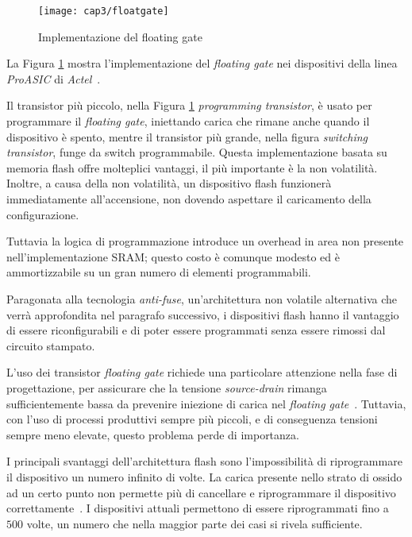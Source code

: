 \begin{figure}  
  \begin{center}
    \texttt{[image: cap3/floatgate]}
    \caption{Implementazione del floating gate}
    \label{floatgate}
  \end{center}
\end{figure}

La Figura \ref{floatgate} mostra l'implementazione del \textit{floating gate} nei dispositivi della linea \textit{ProASIC} di \textit{Actel}~\cite{actelpro}. 

Il transistor più piccolo, nella Figura \ref{floatgate} \textit{programming transistor}, è usato per programmare il \textit{floating gate}, iniettando carica che rimane anche quando il dispositivo è spento, mentre il transistor più grande, nella figura \textit{switching transistor}, funge da switch programmabile. Questa implementazione basata su memoria flash offre molteplici vantaggi, il più importante è la non volatilità. Inoltre, a causa della non volatilità, un dispositivo flash funzionerà immediatamente all'accensione, non dovendo aspettare il caricamento della configurazione.

Tuttavia la logica di programmazione introduce un overhead in area non presente nell'implementazione SRAM; questo costo è comunque modesto ed è ammortizzabile su un gran numero di elementi programmabili.

Paragonata alla tecnologia \textit{anti-fuse}, un'architettura non volatile alternativa che verrà approfondita nel paragrafo successivo, i dispositivi flash hanno il vantaggio di essere riconfigurabili e di poter essere programmati senza essere rimossi dal circuito stampato.

L'uso dei transistor \textit{floating gate} richiede una particolare attenzione nella fase di progettazione, per assicurare che la tensione \textit{source-drain} rimanga sufficientemente bassa da prevenire iniezione di carica nel \textit{floating gate}~\cite{510550}. Tuttavia, con l'uso di processi produttivi sempre più piccoli, e di conseguenza tensioni sempre meno elevate, questo problema perde di importanza.

I principali svantaggi dell'architettura flash sono l'impossibilità di riprogrammare il dispositivo un numero infinito di volte. La carica presente nello strato di ossido ad un certo punto non permette più di cancellare e riprogrammare il dispositivo correttamente~\cite{622505}. I dispositivi attuali permettono di essere riprogrammati fino a $500$ volte, un numero che nella maggior parte dei casi si rivela sufficiente.

